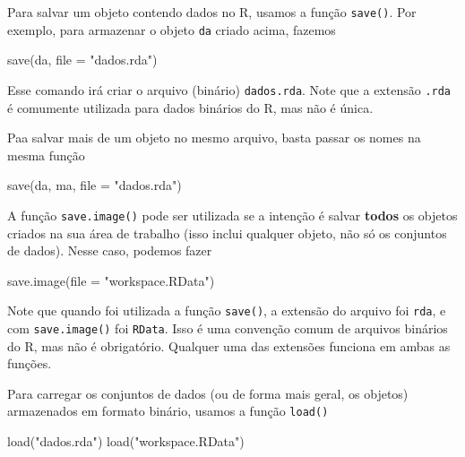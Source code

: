 \documentclass[
  10pt,
  a4paper]{book}
\newenvironment{Shaded}{\begin{snugshade}}{\end{snugshade}}
\newcommand{\AttributeTok}[1]{\textcolor[rgb]{0.77,0.63,0.00}{#1}}
\newcommand{\FunctionTok}[1]{\textcolor[rgb]{0.00,0.00,0.00}{#1}}
\newcommand{\NormalTok}[1]{#1}
\newcommand{\StringTok}[1]{\textcolor[rgb]{0.31,0.60,0.02}{#1}}
\begin{document}
Para salvar um objeto contendo dados no R, usamos a função \texttt{save()}. Por
exemplo, para armazenar o objeto \texttt{da} criado acima, fazemos

\begin{Shaded}
\begin{Highlighting}[]
\FunctionTok{save}\NormalTok{(da, }\AttributeTok{file =} \StringTok{"dados.rda"}\NormalTok{)}
\end{Highlighting}
\end{Shaded}

Esse comando irá criar o arquivo (binário) \texttt{dados.rda}. Note que a extensão
\texttt{.rda} é comumente utilizada para dados binários do R, mas não é única.

Paa salvar mais de um objeto no mesmo arquivo, basta passar os nomes na
mesma função

\begin{Shaded}
\begin{Highlighting}[]
\FunctionTok{save}\NormalTok{(da, ma, }\AttributeTok{file =} \StringTok{"dados.rda"}\NormalTok{)}
\end{Highlighting}
\end{Shaded}

A função \texttt{save.image()} pode ser utilizada se a intenção é salvar
\textbf{todos} os objetos criados na sua área de trabalho (isso inclui
qualquer objeto, não só os conjuntos de dados). Nesse caso, podemos
fazer

\begin{Shaded}
\begin{Highlighting}[]
\FunctionTok{save.image}\NormalTok{(}\AttributeTok{file =} \StringTok{"workspace.RData"}\NormalTok{)}
\end{Highlighting}
\end{Shaded}

Note que quando foi utilizada a função \texttt{save()}, a extensão do arquivo
foi \texttt{rda}, e com \texttt{save.image()} foi \texttt{RData}. Isso é uma convenção comum
de arquivos binários do R, mas não é obrigatório. Qualquer uma das
extensões funciona em ambas as funções.

Para carregar os conjuntos de dados (ou de forma mais geral, os objetos)
armazenados em formato binário, usamos a função \texttt{load()}

\begin{Shaded}
\begin{Highlighting}[]
\FunctionTok{load}\NormalTok{(}\StringTok{"dados.rda"}\NormalTok{)}
\FunctionTok{load}\NormalTok{(}\StringTok{"workspace.RData"}\NormalTok{)}
\end{Highlighting}
\end{Shaded}
\end{document}
